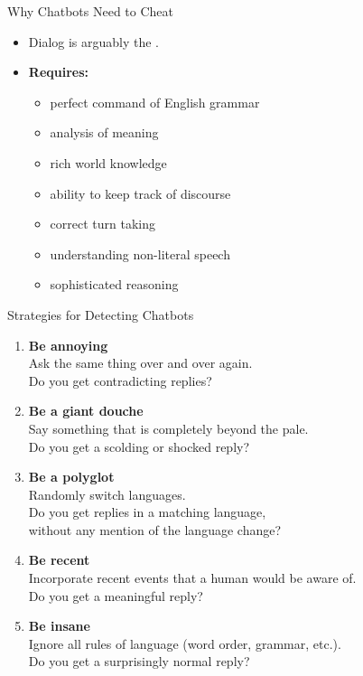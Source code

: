 \documentclass[xcolor={usenames,svgnames,x11names,dvipsnames,table}]{beamer}
\begin{document}
\begin{frame}{Why Chatbots Need to Cheat}
    \begin{itemize}
        \item Dialog is arguably the .
        \item \textbf{Requires:}
            \begin{itemize}
                \item perfect command of English grammar
                \item analysis of meaning
                \item rich world knowledge
                \item ability to keep track of discourse\\
                \item correct turn taking
                \item understanding non-literal speech\\
                \item sophisticated reasoning\\
            \end{itemize}
    \end{itemize}
\end{frame}

\begin{frame}{Strategies for Detecting Chatbots}
    \begin{enumerate}[<+->]
        \item \textbf{Be annoying}\\
              Ask the same thing over and over again.\\
              Do you get contradicting replies?
        \item \textbf{Be a giant douche}\\
              Say something that is completely beyond the pale.\\
              Do you get a scolding or shocked reply?
        \item \textbf{Be a polyglot}\\
              Randomly switch languages.\\
              Do you get replies in a matching language,\\
              without any mention of the language change?
        \item \textbf{Be recent}\\
              Incorporate recent events that a human would be aware of.\\
              Do you get a meaningful reply?
        \item \textbf{Be insane}\\
              Ignore all rules of language (word order, grammar, etc.).\\
              Do you get a surprisingly normal reply?
    \end{enumerate}
\end{frame}
\end{document}
